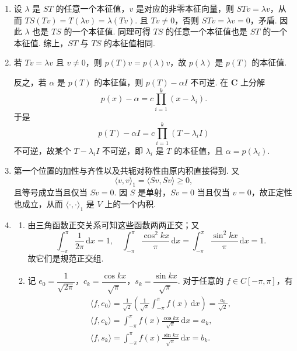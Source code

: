 \begin{enumerate}
    \item 设 $\lambda$ 是 $ST$ 的任意一个本征值，$v$ 是对应的非零本征向量，则 $STv=\lambda v$，从而 $TS(Tv)=T(\lambda v) =\lambda(Tv)$. 且 $Tv\neq 0$，否则 $STv=\lambda v=0$，矛盾. 因此 $\lambda$ 也是 $TS$ 的一个本征值. 同理可得 $TS$ 的任意一个本征值也是 $ST$ 的一个本征值. 综上，$ST$ 与 $TS$ 的本征值相同.

    \item 若 $T v=\lambda v$ 且 $v\neq 0$，则 $p(T)v=p(\lambda)v$，故 $p(\lambda)$ 是 $p(T)$ 的本征值.

    反之，若 $\alpha$ 是 $p(T)$ 的本征值，则 $p(T)-\alpha I$ 不可逆. 在 $\mathbf{C}$ 上分解
    \[
        p(x)-\alpha=c\prod_{i=1}^k(x-\lambda_i).
    \]
    于是
    \[
        p(T)-\alpha I=c\prod_{i=1}^k(T-\lambda_i I)
    \]
    不可逆，故某个 $T-\lambda_iI$ 不可逆，即 $\lambda_i$ 是 $T$ 的本征值，且 $\alpha=p(\lambda_i)$.

    \item 第一个位置的加性与齐性以及共轭对称性由原内积直接得到. 又
    \[
        \langle v,v\rangle_1=\langle Sv,Sv\rangle\geqslant 0,
    \]
    且等号成立当且仅当 $Sv=0$. 因 $S$ 是单射，$Sv=0$ 当且仅当 $v=0$，故正定性也成立，从而 $\langle\cdot,\cdot\rangle_1$ 是 $V$ 上的一个内积.

    \item
    \begin{enumerate}
        \item 由三角函数正交关系可知这些函数两两正交；又
        \[
            \int_{-\pi}^{\pi}\frac{1}{2\pi}\,\mathrm{d}x=1,\quad
            \int_{-\pi}^{\pi}\frac{\cos^2 kx}{\pi}\,\mathrm{d}x
            =
            \int_{-\pi}^{\pi}\frac{\sin^2 kx}{\pi}\,\mathrm{d}x=1.
        \]
        故它们是规范正交组.

        \item 记 $e_0 = \dfrac{1}{\sqrt{2\pi}}$，$c_k = \dfrac{\cos kx}{\sqrt{\pi}}$，$s_k = \dfrac{\sin kx}{\sqrt{\pi}}$. 对于任意的 $f \in C[-\pi,\pi]$，有
        \begin{gather*}
            \langle f,e_0\rangle = \frac{1}{\sqrt{2}}(\frac{1}{\sqrt{\pi}}\int_{-\pi}^{\pi}f(x)\,\mathrm{d}x)=\frac{a_0}{\sqrt{2}}, \\
            \langle f,c_k\rangle = \int_{-\pi}^{\pi}f(x)\frac{\cos kx}{\sqrt{\pi}}\,\mathrm{d}x=a_k, \\
            \langle f,s_k\rangle = \int_{-\pi}^{\pi}f(x)\frac{\sin kx}{\sqrt{\pi}}\,\mathrm{d}x=b_k.
        \end{gather*}


\end{enumerate}
\end{enumerate}
